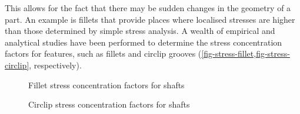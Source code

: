 This allows for the fact that there may be sudden changes in the geometry of a part. An example is fillets that provide places where localised stresses are higher than those determined by simple stress analysis. A wealth of empirical and analytical studies have been performed to determine the stress concentration factors for features, such as fillets and circlip grooves (\cref{fig-stress-fillet,fig-stress-circlip}, respectively). 

\begin{figure*}[t!]
  
    \hfill{}
    \subfloat[Bending]{
        
    }
    \hfill{}
    \subfloat[Torsion]{
        
    }
    \hfill{}
    
    \vspace{1em}
    \caption{Fillet stress concentration factors for shafts}\label{fig-stress-fillet}
\end{figure*}

\begin{figure*}[t]
    
    \hfill{}
    \subfloat[Bending]{
        
    }
    \hfill{}
    \subfloat[Torsion]{
        
    }
    \hfill{}
    
    \vspace{1em}
    \caption{Circlip stress concentration factors for shafts}\label{fig-stress-circlip}
\end{figure*}

